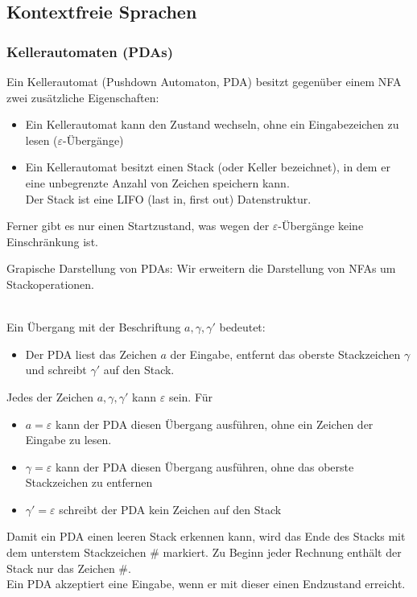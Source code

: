 \documentclass[a4paper]{scrartcl}
\begin{document}
\subsection{Kontextfreie Sprachen}
\subsubsection{Kellerautomaten (PDAs)}
Ein Kellerautomat (Pushdown Automaton, PDA) besitzt gegenüber einem NFA zwei zusätzliche Eigenschaften:
\begin{itemize}
\item Ein Kellerautomat kann den Zustand wechseln, ohne ein Eingabezeichen zu lesen ($\varepsilon$-Übergänge)
\item Ein Kellerautomat besitzt einen Stack (oder Keller bezeichnet), in dem er eine unbegrenzte Anzahl von Zeichen speichern kann.\\
Der Stack ist eine LIFO (last in, first out) Datenstruktur.
\end{itemize}
Ferner gibt es nur einen Startzustand, was wegen der $\varepsilon$-Übergänge keine Einschränkung ist.

Grapische Darstellung von PDAs: Wir erweitern die Darstellung von NFAs um Stackoperationen.\\
\\
Ein Übergang mit der Beschriftung $a,\gamma,\gamma'$ bedeutet:
\begin{itemize}
\item Der PDA liest das Zeichen $a$ der Eingabe, entfernt das oberste Stackzeichen $\gamma$ und schreibt $\gamma'$ auf den Stack.\\
\end{itemize}
Jedes der Zeichen $a,\gamma,\gamma'$ kann $\varepsilon$ sein. Für
\begin{itemize}
\item $a=\varepsilon$ kann der PDA diesen Übergang ausführen, ohne ein Zeichen der Eingabe zu lesen.
\item $\gamma = \varepsilon$ kann der PDA diesen Übergang ausführen, ohne das oberste Stackzeichen zu entfernen
\item $\gamma' = \varepsilon$ schreibt der PDA kein Zeichen auf den Stack
\end{itemize}
Damit ein PDA einen leeren Stack erkennen kann, wird das Ende des Stacks mit dem unterstem Stackzeichen $\#$ markiert. Zu Beginn jeder Rechnung enthält der Stack nur das Zeichen $\#$.\\
Ein PDA akzeptiert eine Eingabe, wenn er mit dieser einen Endzustand erreicht.
\end{document}
